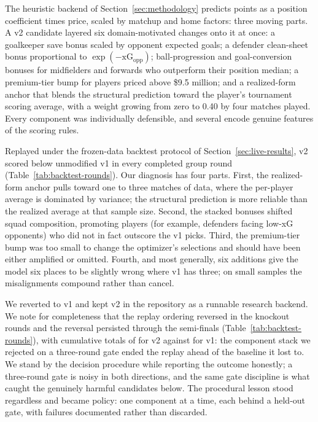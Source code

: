 The heuristic backend of Section~\ref{sec:methodology} predicts
points as a position coefficient times price, scaled by matchup and
home factors: three moving parts. A v2 candidate layered six
domain-motivated changes onto it at once: a goalkeeper save bonus
scaled by opponent expected goals; a defender clean-sheet bonus
proportional to $\exp(-\mathrm{xG}_{\mathrm{opp}})$; ball-progression
and goal-conversion bonuses for midfielders and forwards who
outperform their position median; a premium-tier bump for players
priced above \$9.5 million; and a realized-form anchor that blends
the structural prediction toward the player's tournament scoring
average, with a weight growing from zero to 0.40 by four matches
played. Every component was individually defensible, and several
encode genuine features of the scoring rules.

Replayed under the frozen-data backtest protocol of
Section~\ref{sec:live-results}, v2 scored below unmodified v1 in
every completed group round (Table~\ref{tab:backtest-rounds}). Our
diagnosis has four parts. First, the realized-form anchor pulls
toward one to three matches of data, where the per-player average is
dominated by variance; the structural prediction is more reliable
than the realized average at that sample size. Second, the stacked
bonuses shifted squad composition, promoting players (for example,
defenders facing low-xG opponents) who did not in fact outscore the
v1 picks. Third, the premium-tier bump was too small to change the
optimizer's selections and should have been either amplified or
omitted. Fourth, and most generally, six additions give the model six
places to be slightly wrong where v1 has three; on small samples the
misalignments compound rather than cancel.

We reverted to v1 and kept v2 in the repository as a runnable
research backend. We note for completeness that the replay ordering
reversed in the knockout rounds and the reversal persisted through
the semi-finals (Table~\ref{tab:backtest-rounds}), with cumulative
totals of \TotalHeuristicVTwo{} for v2 against \TotalHeuristic{} for
v1: the component stack we rejected on a three-round gate ended the
replay ahead of the baseline it lost to. We stand by the decision
procedure while reporting the outcome honestly; a three-round gate
is noisy in both directions, and the same gate discipline is what
caught the genuinely harmful candidates below. The procedural
lesson stood regardless and became policy:
one component at a time, each behind a held-out gate, with failures
documented rather than discarded.

